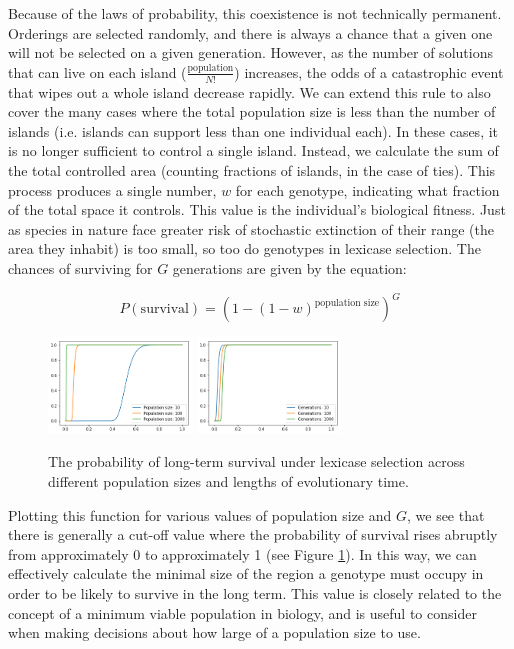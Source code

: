 Because of the laws of probability, this coexistence is not technically permanent. Orderings are selected randomly, and there is always a chance that a given one will not be selected on a given generation. However, as the number of solutions that can live on each island ($\frac{\text{population}}{N!}$) increases, the odds of a catastrophic event that wipes out a whole island decrease rapidly. We can extend this rule to also cover the many cases where the total population size is less than the number of islands (i.e. islands can support less than one individual each). In these cases, it is no longer sufficient to control a single island. Instead, we calculate the sum of the total controlled area (counting fractions of islands, in the case of ties). This process produces a single number, $w$ for each genotype, indicating what fraction of the total space it controls. This value is the individual's biological fitness. Just as species in nature face greater risk of stochastic extinction of their range (the area they inhabit) is too small, so too do genotypes in lexicase selection. The chances of surviving for $G$ generations are given by the equation:

\begin{equation}
P(\text{survival}) = (1 - (1-w)^{\text{population size}})^{G}
\end{equation}
\begin{figure}
\includegraphics[width=1.5in]{figs/survival_pop_size.png}
\includegraphics[width=1.5in]{figs/survival_generations.png}
\caption{The probability of long-term survival under lexicase selection across different population sizes and lengths of evolutionary time.}
\label{prob_survival}
\end{figure}

Plotting this function for various values of population size and $G$, we see that there is generally a cut-off value where the probability of survival rises abruptly from approximately 0 to approximately 1 (see Figure \ref{prob_survival}). In this way, we can effectively calculate the minimal size of the region a genotype must occupy in order to be likely to survive in the long term. This value is closely related to the concept of a minimum viable population in biology, and is useful to consider when making decisions about how large of a population size to use. 

